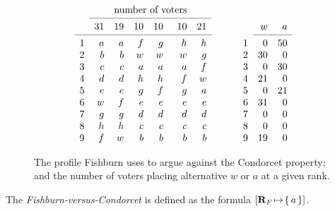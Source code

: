 \documentclass{comsoc2016}
\begin{document}
\begin{figure}
        \begin{equation}
                \newlength{\ldisttables}
                \setlength{\ldisttables}{13mm}
                \begin{array}{lrrrrrr@{\hskip \ldisttables}lrr}
                        &&\multicolumn{4}{c}{\text{number of voters}}\\
                \cmidrule(r{\dimexpr \ldisttables - \cmidrulekern \relax}){2-7}
                                &31     &19     &10     &10     &10     &21     &       &w      &a\\
                \cmidrule(r{\dimexpr \ldisttables - \cmidrulekern \relax}){1-7}\cmidrule{9-10}
                        1       &a      &a      &f      &g      &h      &h      &1      &0      &50     \\
                        2       &b      &b      &w      &w      &w      &g      &2      &30     &0      \\
                        3       &c      &c      &a      &a      &a      &f      &3      &0      &30     \\
                        4       &d      &d      &h      &h      &f      &w      &4      &21     &0      \\
                        5       &e      &e      &g      &f      &g      &a      &5      &0      &21     \\
                        6       &w      &f      &e      &e      &e      &e      &6      &31     &0      \\
                        7       &g      &g      &d      &d      &d      &d      &7      &0      &0      \\
                        8       &h      &h      &c      &c      &c      &c      &8      &0      &0      \\
                        9       &f      &w      &b      &b      &b      &b      &9      &19     &0      \\
                \end{array}
        \end{equation}
        \caption{The profile Fishburn uses to argue against the Condorcet property; and the number of voters placing alternative $w$ or $a$ at a given rank.}
        \label{fig:fishburnProfile}
\end{figure}

\begin{description}
\label{def:fvsc}
\item[\laxiom{FvsC}] The \emph{Fishburn-versus-Condorcet \txtlaxiom{}} is defined as the formula $\lato[\prof_F][\set{a}]$.%
\end{description}
\end{document}
